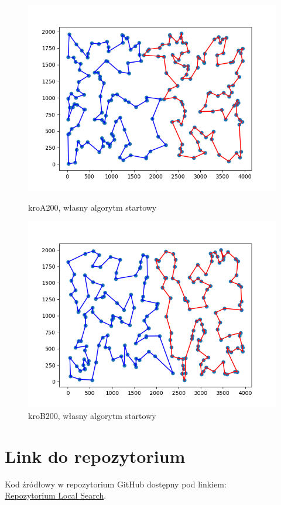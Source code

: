\documentclass[11pt]{article}
\begin{document}
\begin{figure}[H]
    \vspace{0.5cm}

    \begin{minipage}[t]{0.45\textwidth}
        \centering
        \includegraphics[width=\linewidth]{best_paths/kroA200/traverse_random/split_paths_regret_TSP}
        \caption{kroA200, własny algorytm startowy}
    \end{minipage}
    \hfill
    \begin{minipage}[t]{0.45\textwidth}
        \centering
        \includegraphics[width=\linewidth]{best_paths/kroB200/traverse_random/split_paths_regret_TSP}
        \caption{kroB200, własny algorytm startowy}
    \end{minipage}
    \label{fig:minipage-random}
\end{figure}

\section{Link do repozytorium}\label{sec:link-do-repo}
Kod źródłowy w repozytorium GitHub dostępny pod linkiem: \\
\href{https://github.com/KotZPolibudy/PUT_IMO/tree/main/Local_search}{Repozytorium Local Search}.
\end{document}
